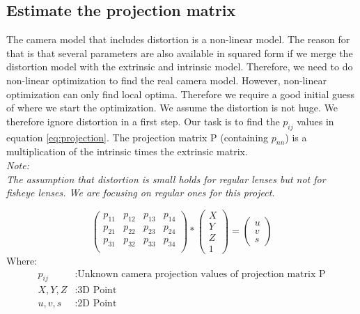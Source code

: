 \documentclass[11pt,a4paper,titlepage,oneside]{report}
\begin{document}
\subsection{Estimate the projection matrix}\label{sec:est_proj}
The camera model that includes distortion is a non-linear model. The reason for that is that several parameters are also available in squared form if we merge the distortion model with the extrinsic and intrinsic model. Therefore, we need to do non-linear optimization to find the real camera model. However, non-linear optimization can only find local optima. Therefore we require a good initial guess of where we start the optimization. We assume the distortion is not huge. We therefore ignore distortion in a first step. Our task is to find the $p_{ij}$ values in equation \ref{eq:projection}. The projection matrix P (containing $p_{nn}$) is a multiplication of the intrinsic times the extrinsic matrix.\\
\em
Note:\\
The assumption that distortion is small holds for regular lenses but not for fisheye lenses. We are focusing on regular ones for this project.
\normalfont

\begin{equation}\label{eq:projection}
	\begin{pmatrix}p_{11} & p_{12} & p_{13} & p_{14}\\
		p_{21} & p_{22} & p_{23} & p_{24}\\
		p_{31} & p_{32} & p_{33} & p_{34}\\
	\end{pmatrix}*
	\begin{pmatrix}
		X \\
		Y \\
		Z \\
		1
	\end{pmatrix}=
	\begin{pmatrix}
		u \\
		v \\
		s
  \end{pmatrix}
\end{equation}
Where:
\begin{align*}
	p_{ij}		&: \text{Unknown camera projection values of projection matrix P}\\
	X,Y,Z			&: \text{3D Point}\\
	u,v,s			&: \text{2D Point}\\
\end{align*}
\end{document}
